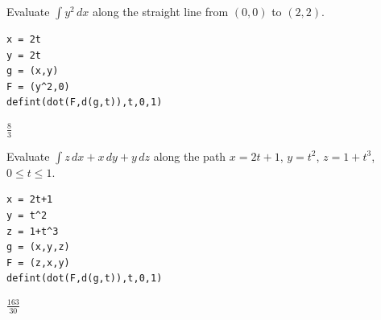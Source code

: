 Evaluate $\int y^2\,dx$ along the straight
line from $(0,0)$ to $(2,2)$.

\begin{Verbatim}[formatcom=\color{blue},samepage=true]
x = 2t
y = 2t
g = (x,y)
F = (y^2,0)
defint(dot(F,d(g,t)),t,0,1)
\end{Verbatim}

$\displaystyle \frac{8}{3}$

Evaluate $\int z\,dx+x\,dy+y\,dz$
along the path
$x=2t+1$, $y=t^2$, $z=1+t^3$, $0\le t\le 1$.

\begin{Verbatim}[formatcom=\color{blue},samepage=true]
x = 2t+1
y = t^2
z = 1+t^3
g = (x,y,z)
F = (z,x,y)
defint(dot(F,d(g,t)),t,0,1)
\end{Verbatim}

$\displaystyle \frac{163}{30}$
